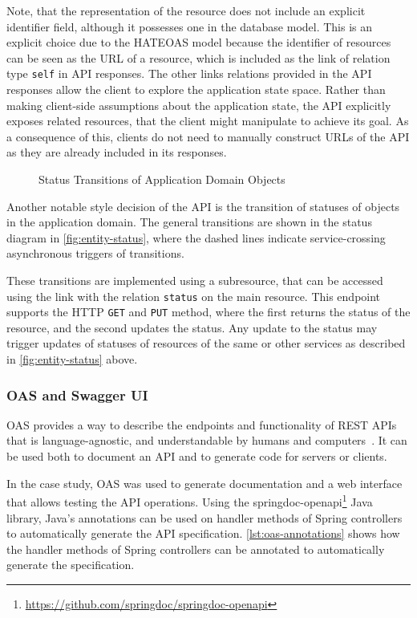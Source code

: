 Note, that the representation of the resource does not include an explicit identifier field, although it possesses one in the database model.
This is an explicit choice due to the \ac{HATEOAS} model because the identifier of resources can be seen as the \ac{URL} of a resource, which is included as the link of relation type \texttt{self} in \ac{API} responses.
The other links relations provided in the \ac{API} responses allow the client to explore the application state space.
Rather than making client-side assumptions about the application state, the \ac{API} explicitly exposes related resources, that the client might manipulate to achieve its goal.
As a consequence of this, clients do not need to manually construct \acp{URL} of the \ac{API} as they are already included in its responses.

\begin{figure}[!htb]
    \centering
    
    \caption{Status Transitions of Application Domain Objects}\label{fig:entity-status}
\end{figure}
 
Another notable style decision of the \ac{API} is the transition of statuses of objects in the application domain.
The general transitions are shown in the status diagram in \autoref{fig:entity-status}, where the dashed lines indicate service-crossing asynchronous triggers of transitions.

These transitions are implemented using a subresource, that can be accessed using the link with the relation \texttt{status} on the main resource.
This endpoint supports the \ac{HTTP} \texttt{GET} and \texttt{PUT} method, where the first returns the status of the resource, and the second updates the status.
Any update to the status may trigger updates of statuses of resources of the same or other services as described in \autoref{fig:entity-status} above.

\subsubsection{\acl{OAS} and Swagger UI}

\ac{OAS} provides a way to describe the endpoints and functionality of \ac{REST} \acp{API} that is language-agnostic, and understandable by humans and computers~\cite{OAS}.
It can be used both to document an \ac{API} and to generate code for servers or clients.

In the case study, \ac{OAS} was used to generate documentation and a web interface that allows testing the \ac{API} operations.
Using the springdoc-openapi\footnote{\url{https://github.com/springdoc/springdoc-openapi}} Java library, Java's annotations can be used on handler methods of Spring controllers to automatically generate the \ac{API} specification.
\autoref{lst:oas-annotations} shows how the handler methods of Spring controllers can be annotated to automatically generate the specification.


